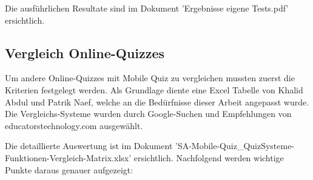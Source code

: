 	Die ausführlichen Resultate sind im Dokument 'Ergebnisse eigene Tests.pdf' ersichtlich.
	

	\subsection{Vergleich Online-Quizzes}
	Um andere Online-Quizzes mit Mobile Quiz zu vergleichen mussten zuerst die Kriterien festgelegt werden. Als Grundlage diente eine Excel Tabelle von Khalid Abdul und Patrik Naef, welche an die Bedürfnisse dieser Arbeit angepasst wurde.
	Die Vergleichs-Systeme wurden durch Google-Suchen und Empfehlungen von educatorstechnology.com \cite{educatorstechnology.com} ausgewählt.
	
	Die detaillierte Auswertung ist im Dokument 'SA-Mobile-Quiz\_QuizSysteme-Funktionen-Vergleich-Matrix.xlsx' ersichtlich. Nachfolgend werden wichtige Punkte daraus genauer aufgezeigt:
	
